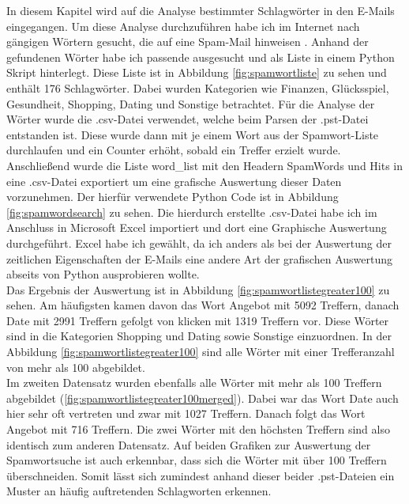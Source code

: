 In diesem Kapitel wird auf die Analyse bestimmter Schlagwörter in den E-Mails eingegangen. Um diese Analyse durchzuführen habe ich im Internet nach gängigen Wörtern gesucht, die auf eine Spam-Mail hinweisen \cite{Heise.07.06.2021}. Anhand der gefundenen Wörter habe ich passende ausgesucht und als Liste in einem Python Skript hinterlegt. Diese Liste ist in Abbildung \ref{fig:spamwortliste} zu sehen und enthält 176 Schlagwörter. Dabei wurden Kategorien wie Finanzen, Glücksspiel, Gesundheit, Shopping, Dating und Sonstige betrachtet. Für die Analyse der Wörter wurde die .csv-Datei verwendet, welche beim Parsen der .pst-Datei entstanden ist. Diese wurde dann mit je einem Wort aus der Spamwort-Liste durchlaufen und ein Counter erhöht, sobald ein Treffer erzielt wurde. Anschließend wurde die Liste \glqq{}word\_list\grqq{} mit den Headern \glqq{}SpamWords\grqq{} und \glqq{}Hits\grqq{} in eine .csv-Datei exportiert um eine grafische Auswertung dieser Daten vorzunehmen. Der hierfür verwendete Python Code ist in Abbildung \ref{fig:spamwordsearch} zu sehen. Die hierdurch erstellte .csv-Datei habe ich im Anschluss in Microsoft Excel importiert und dort eine Graphische Auswertung durchgeführt. Excel habe ich gewählt, da ich anders als bei der Auswertung der zeitlichen Eigenschaften der E-Mails eine andere Art der grafischen Auswertung abseits von Python ausprobieren wollte. \\


Das Ergebnis der Auswertung ist in Abbildung \ref{fig:spamwortlistegreater100} zu sehen. Am häufigsten kamen davon das Wort \glqq{}Angebot\grqq{} mit 5092 Treffern, danach \glqq{}Date\grqq{} mit 2991 Treffern gefolgt von \glqq{}klicken\grqq{} mit 1319 Treffern vor. Diese Wörter sind in die Kategorien Shopping und Dating sowie Sonstige einzuordnen. In der Abbildung \ref{fig:spamwortlistegreater100} sind alle Wörter mit einer Trefferanzahl von mehr als 100 abgebildet. \\


Im zweiten Datensatz wurden ebenfalls alle Wörter mit mehr als 100 Treffern abgebildet (\ref{fig:spamwortlistegreater100merged}). Dabei war das Wort \glqq{}Date\grqq{} auch hier sehr oft vertreten und zwar mit 1027 Treffern. Danach folgt das Wort \glqq{}Angebot\grqq{} mit 716 Treffern. Die zwei Wörter mit den höchsten Treffern sind also identisch zum anderen Datensatz. Auf beiden Grafiken zur Auswertung der Spamwortsuche ist auch erkennbar, dass sich die Wörter mit über 100 Treffern überschneiden. Somit lässt sich zumindest anhand dieser beider .pst-Dateien ein Muster an häufig auftretenden Schlagworten erkennen. 

